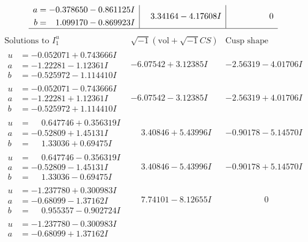 \documentclass[1p]{elsarticle_modified}
\theoremstyle{definition}
\newcommand{\I}{\sqrt{-1}}
\begin{document}
$$\begin{array}{c|c|c}
\begin{aligned}
a &= -0.378650 - 0.861125 I \\
b &= \phantom{-}1.099170 - 0.869923 I\end{aligned}
 & \phantom{-}3.34164 - 4.17608 I & \phantom{-0.000000 } 0\\
 \hline 
 \end{array}$$\newpage$$\begin{array}{c|c|c}  
\text{Solutions to }I^u_{1}& \I (\text{vol} + \sqrt{-1}CS) & \text{Cusp shape}\\
 \hline 
\begin{aligned}
u &= -0.052071 + 0.743666 I \\
a &= -1.22281 - 1.12361 I \\
b &= -0.525972 - 1.114410 I\end{aligned}
 & -6.07542 + 3.12385 I & -2.56319 - 4.01706 I \\ \hline\begin{aligned}
u &= -0.052071 - 0.743666 I \\
a &= -1.22281 + 1.12361 I \\
b &= -0.525972 + 1.114410 I\end{aligned}
 & -6.07542 - 3.12385 I & -2.56319 + 4.01706 I \\ \hline\begin{aligned}
u &= \phantom{-}0.647746 + 0.356319 I \\
a &= -0.52809 + 1.45131 I \\
b &= \phantom{-}1.33036 + 0.69475 I\end{aligned}
 & \phantom{-}3.40846 + 5.43996 I & -0.90178 - 5.14570 I \\ \hline\begin{aligned}
u &= \phantom{-}0.647746 - 0.356319 I \\
a &= -0.52809 - 1.45131 I \\
b &= \phantom{-}1.33036 - 0.69475 I\end{aligned}
 & \phantom{-}3.40846 - 5.43996 I & -0.90178 + 5.14570 I \\ \hline\begin{aligned}
u &= -1.237780 + 0.300983 I \\
a &= -0.68099 - 1.37162 I \\
b &= \phantom{-}0.955357 - 0.902724 I\end{aligned}
 & \phantom{-}7.74101 - 8.12655 I & \phantom{-0.000000 } 0 \\ \hline\begin{aligned}
u &= -1.237780 - 0.300983 I \\
a &= -0.68099 + 1.37162 I \\

\end{aligned}
\end{array}$$
\end{document}
